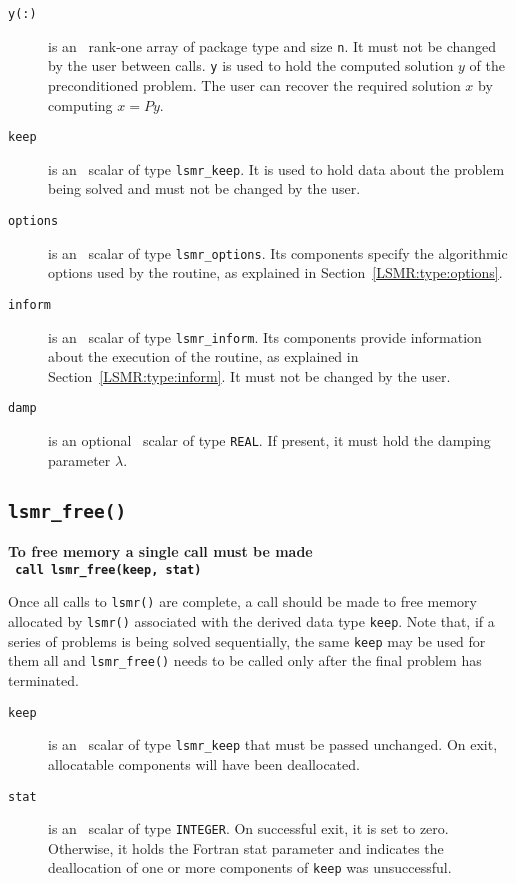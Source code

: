 \begin{description}
\item[\texttt{y(:)}] is an \intentinout\ rank-one array of package type 
and size {\tt n}. It must not be changed by the user between calls.
{\tt y} is used to hold the computed solution $y$ of the preconditioned problem.
The user can recover the required solution $x$ by computing $x = Py$.

\item[\texttt{keep}] is an \intentinout\ scalar of type
{\tt lsmr\_keep}. It is used to hold data about the problem being
solved and must not be changed by the user.

\item[\texttt{options}] is an \intentin\ scalar of type {\tt lsmr\_options}.
Its components specify the algorithmic options used by the routine, as
explained in Section~\ref{LSMR:type:options}.

\item[\texttt{inform}] is an \intentinout\ scalar of type
{\tt lsmr\_inform}. Its components provide information about the execution
of the routine, as explained in Section~\ref{LSMR:type:inform}.
It must not be changed by the user.

\item[\texttt{damp}] is an optional \intentin\ scalar of type
{\tt REAL}. If present, it must hold the damping parameter $\lambda$.

\end{description}



\subsection{\texttt{lsmr\_free()}}
\textbf{To free memory a single call must be made\\
   \vspace{0.2cm}
    \texttt{ \hspace*{0.2cm}
      call lsmr\_free(keep, stat)
   }
}
\vspace{0.2cm}

\noindent
Once all  calls to \texttt{lsmr()} are complete,
a call should be made to free memory  allocated by
\texttt{lsmr()}  associated with the derived data type {\tt keep}.
Note that, if a series of problems is being solved sequentially, the same {\tt keep}
may be used for them all and {\tt lsmr\_free()} needs to be called only
after the final problem has terminated.

\begin{description}

\item[\texttt{keep}] is an \intentinout\ scalar  of type {\tt lsmr\_keep}
that must be passed unchanged.
On exit, allocatable components will have been deallocated.

\item[\texttt{stat}] is an \intentout\ scalar of type {\tt INTEGER}.
On successful exit, it is set to zero. Otherwise, it holds the Fortran stat
parameter and indicates the deallocation of one or more components of
{\tt keep} was unsuccessful.

\end{description}



